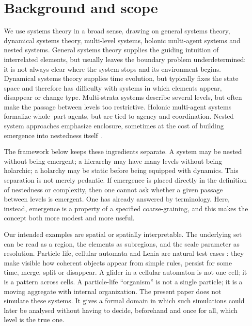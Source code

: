 \documentclass[runningheads]{llncs}
\begin{document}
\section{Background and scope}

We use systems theory in a broad sense, drawing on general systems theory, dynamical systems theory, multi-level systems, holonic multi-agent systems and nested systems. General systems theory supplies the guiding intuition of interrelated elements, but usually leaves the boundary problem underdetermined: it is not always clear where the system stops and its environment begins. Dynamical systems theory supplies time evolution, but typically fixes the state space and therefore has difficulty with systems in which elements appear, disappear or change type. Multi-strata systems describe several levels, but often make the passage between levels too restrictive. Holonic multi-agent systems formalize whole--part agents, but are tied to agency and coordination. Nested-system approaches emphasize enclosure, sometimes at the cost of building emergence into nestedness itself \cite{Backlund2000,Mesarovic1970,Mesarovic1976,Fischer2003,Koestler1967,Walloth2016}.

The framework below keeps these ingredients separate. A system may be nested without being emergent; a hierarchy may have many levels without being holarchic; a holarchy may be static before being equipped with dynamics. This separation is not merely pedantic. If emergence is placed directly in the definition of nestedness or complexity, then one cannot ask whether a given passage between levels is emergent. One has already answered by terminology. Here, instead, emergence is a property of a specified coarse-graining, and this makes the concept both more modest and more useful.

Our intended examples are spatial or spatially interpretable. The underlying set can be read as a region, the elements as subregions, and the scale parameter as resolution. Particle life, cellular automata and Lenia are natural test cases \cite{Gardner1970,Chan2019}: they make visible how coherent objects appear from simple rules, persist for some time, merge, split or disappear. A glider in a cellular automaton is not one cell; it is a pattern across cells. A particle-life ``organism'' is not a single particle; it is a moving aggregate with internal organization. The present paper does not simulate these systems. It gives a formal domain in which such simulations could later be analysed without having to decide, beforehand and once for all, which level is the true one.
\end{document}
